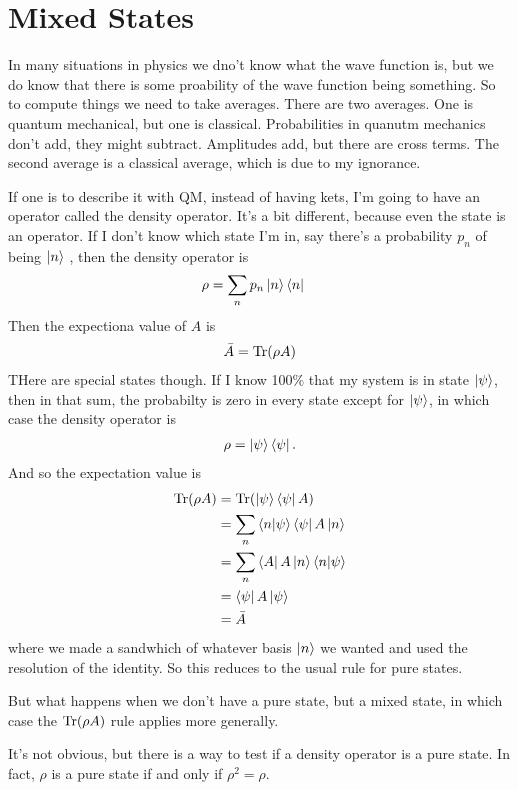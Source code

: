 \section{Mixed States}
In many situations in physics we dno't know what the wave function is,
but we do know that there is some proability of the wave function being
something.
So to compute things we need to take averages.
There are two averages.
One is quantum mechanical, but one is classical.
Probabilities in quanutm mechanics don't add,
they might subtract.
Amplitudes add,
but there are cross terms.
The second average is a classical average,
which is due to my ignorance.

If one is to describe it with QM,
instead of having kets,
I'm going to have an operator called the density operator.
It's a bit different,
because even the state is an operator.
If I don't know which state I'm in,
say there's a probability $p_n$ of being $\ket{n}$ ,
then the density operator is
\begin{align}
    \rho &= \sum_{n} p_n \ket{n}\bra{n}
\end{align}
Then the expectiona value of $A$ is
\begin{align}
    \bar{A} = \Tr(\rho A)
\end{align}
THere are special states though.
If I know 100\% that my system is in state $\ket{\psi}$,
then in that sum,
the probabilty is zero in every state except for $\ket{\psi}$,
in which case the density operator is
\begin{align}
    \rho = \ket{\psi}\bra{\psi}.
\end{align}
And so the expectation value is
\begin{align}
    \Tr(\rho A) &=
    \Tr(\ket{\psi}\bra{\psi} A)\\
    &= \sum_n \braket{n}{\psi} \bra{\psi}A\ket{n}\\
    &= \sum_n \bra{A}A\ket{n}\braket{n}{\psi}\\
    &= \bra{\psi}A\ket{\psi}\\
    &= \bar{A}
\end{align}
where we made a sandwhich of whatever basis $\ket{n}$ we wanted
and used the resolution of the identity.
So this reduces to the usual rule for pure states.

But what happens when we don't have a pure state,
but a mixed state,
in which case the $\Tr(\rho A)$ rule applies more generally.

It's not obvious, but there is a way to test if a density operator is a pure
state.
In fact,
$\rho$
is a pure state if and only if
$\rho^2 = \rho$.

